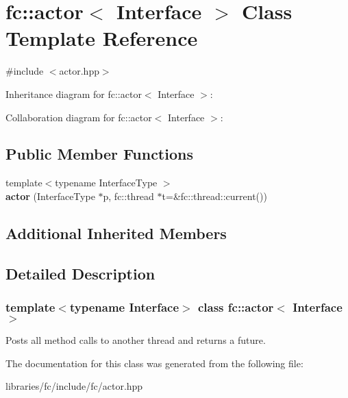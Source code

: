 \hypertarget{classfc_1_1actor}{}\section{fc\+:\+:actor$<$ Interface $>$ Class Template Reference}
\label{classfc_1_1actor}


{\ttfamily \#include $<$actor.\+hpp$>$}



Inheritance diagram for fc\+:\+:actor$<$ Interface $>$\+:


Collaboration diagram for fc\+:\+:actor$<$ Interface $>$\+:
\subsection*{Public Member Functions}
\begin{DoxyCompactItemize}
\item 
\mbox{\label{classfc_1_1actor_a0fde6af44005847adc6ffd5e39cb0bcf}} 
{\footnotesize template$<$typename Interface\+Type $>$ }\\{\bfseries actor} (Interface\+Type $\ast$p, fc\+::thread $\ast$t=\&fc\+::thread\+::current())
\end{DoxyCompactItemize}
\subsection*{Additional Inherited Members}


\subsection{Detailed Description}
\subsubsection*{template$<$typename Interface$>$\newline
class fc\+::actor$<$ Interface $>$}

Posts all method calls to another thread and returns a future. 

The documentation for this class was generated from the following file\+:\begin{DoxyCompactItemize}
\item 
libraries/fc/include/fc/actor.\+hpp\end{DoxyCompactItemize}
